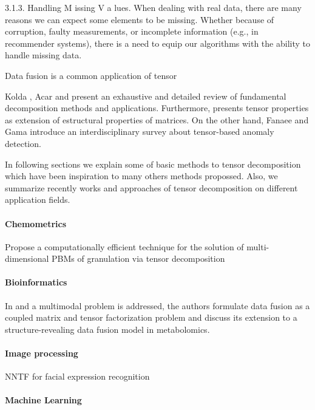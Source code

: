 \documentclass[letterpaper,12pt]{article}
\begin{document}
3.1.3. Handling M issing V a lues. When dealing with real data, there are many reasons we can expect some elements to be missing. Whether because of corruption, faulty measurements, or incomplete information (e.g., in recommender systems), there is a need to equip our algorithms with the ability to handle missing data.\cite{Papalexakis2016}



Data fusion is a common application of tensor 

Kolda \cite{Kolda2009}, Acar \cite{Acar2009} and \cite{Comon2014} present an exhaustive and detailed review of fundamental decomposition methods and applications. Furthermore, \cite{Dartois2016} presents tensor properties as extension of estructural properties of matrices. On the other hand, Fanaee and Gama \cite{Fanaee-T2016} introduce an interdisciplinary survey about tensor-based anomaly detection.

In following sections we explain some of basic methods to tensor decomposition which have been inspiration to many others methods propossed. Also, we summarize recently  works and approaches of tensor decomposition on different application fields.

\paragraph{Chemometrics}

\cite{Chaudhury2014} Propose a computationally efficient technique for the solution of multi-dimensional PBMs of granulation via tensor decomposition

\paragraph{Bioinformatics}

In \cite{Acar2015} and \cite{Acar2014} a multimodal problem is addressed, the authors formulate data fusion as a coupled matrix and tensor factorization problem and discuss its extension to a structure-revealing data fusion model in metabolomics.


\paragraph{Image processing}

\cite{An2015} NNTF for facial expression recognition


\paragraph{Machine Learning}
\end{document}
